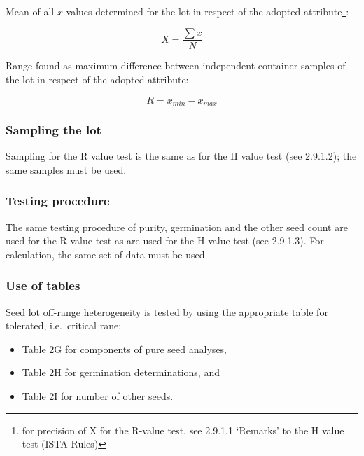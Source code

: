 \documentclass[]{book}
\providecommand{\tightlist}{%
  \setlength{\itemsep}{0pt}\setlength{\parskip}{0pt}}
\begin{document}
Mean of all \(x\) values determined for the lot in respect of the
adopted attribute\footnote{for precision of X for the R-value test, see
  2.9.1.1 `Remarks' to the H value test (ISTA Rules)}:

\[
\bar{X} = \frac{\sum{x}}{N}
\]

Range found as maximum difference between independent container samples
of the lot in respect of the adopted attribute:

\[
R = x_{min} - x_{max}
\]

\subsubsection{Sampling the lot}\label{sampling-the-lot-1}

Sampling for the R value test is the same as for the H value test (see
2.9.1.2); the same samples must be used.

\subsubsection{Testing procedure}\label{testing-procedure-1}

The same testing procedure of purity, germination and the other seed
count are used for the R value test as are used for the H value test
(see 2.9.1.3). For calculation, the same set of data must be used.

\subsubsection{Use of tables}\label{use-of-tables}

Seed lot off-range heterogeneity is tested by using the appropriate
table for tolerated, i.e.~critical rane:

\begin{itemize}
\tightlist
\item
  Table 2G for components of pure seed analyses,
\item
  Table 2H for germination determinations, and
\item
  Table 2I for number of other seeds.
\end{itemize}
\end{document}
